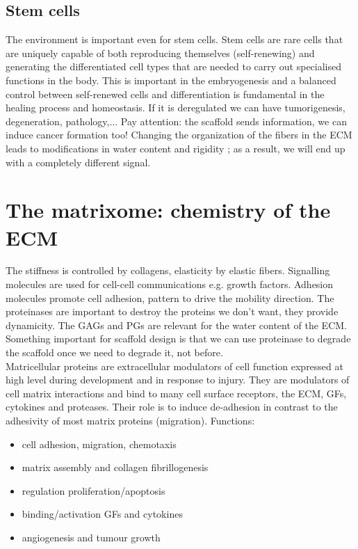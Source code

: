 \subsection{Stem cells}
The environment is important even for stem cells. Stem cells are rare cells that are uniquely capable of both reproducing themselves (self-renewing) and generating the differentiated cell types that are needed to carry out specialised functions in the body.
This is important in the embryogenesis and a balanced control between self-renewed cells and differentiation is fundamental in the healing process and homeostasis. If it is deregulated we can have tumorigenesis, degeneration, pathology,...
Pay attention: the scaffold sends information, we can induce cancer formation too!
Changing the organization of the fibers in the ECM leads to modifications in water content and rigidity ; as a result, we will end up with a completely different signal.

\section{The matrixome: chemistry of the ECM}
The stiffness is controlled by collagens, elasticity by elastic fibers.
Signalling molecules are used for cell-cell communications e.g. growth factors.
Adhesion molecules promote cell adhesion, pattern to drive the mobility direction.
The proteinases are important to destroy the proteins we don’t want, they provide dynamicity. The GAGs and PGs are relevant for the water content of the ECM.
Something important for scaffold design is that we can use proteinase to degrade the scaffold once we need to degrade it, not before.
\\
\noindent
Matricellular proteins are extracellular modulators of cell function expressed at high level during development and in response to injury. They are modulators of cell matrix interactions and bind to many cell surface receptors, the ECM, GFs, cytokines and proteases. Their role is to induce de-adhesion in contrast to the adhesivity of most matrix proteins (migration).
\noindent
Functions:
\begin{itemize}
\item cell adhesion, migration, chemotaxis
\item matrix assembly and collagen fibrillogenesis
\item regulation proliferation/apoptosis
\item binding/activation GFs and cytokines
\item angiogenesis and tumour growth
\end{itemize}

